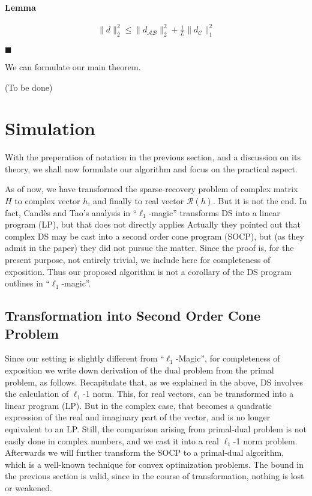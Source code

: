 \documentclass[12pt]{article}
\newcommand{\MC}[1]{\mathcal{#1}}
\newcounter{NumResult}
\newcommand{\myCount}
{
   \stepcounter{NumResult}
   \textbf{\arabic{NumResult}}
}
\newcommand {\Result} [2]
{
   \bigskip
   \myCount \textbf{#1} \par
   {#2} \par
   \hfill \(\blacksquare\)
   \bigskip
}
\begin{document}
\Result
{Lemma}
{
\begin{align}
\|d\|_2^2
\leq \|d_{\MC{A}\MC{B}}\|_2^2 +\frac{1}{L} \|d_{\MC{C}}\|_1^2
\end{align}
}

We can formulate our main theorem.

(To be done)

\section{Simulation}

With the preperation of notation in the previous section, and a discussion on its theory, we shall now formulate our algorithm and focus on the practical aspect.

As of now, we have transformed the sparse-recovery problem of complex matrix \(H\) to complex vector \(h\), and finally to real vector \(\MC{R}(h)\).
But it is not the end.
In fact, Cand\`es and Tao's analysis in ``\(\ell_1\)-magic'' transforms DS into a linear program (LP), but that does not directly applies
Actually they pointed out that complex DS may be cast into a second order cone program (SOCP), but (as they admit in the paper) they did not pursue the matter.
Since the proof is, for the present purpose, not entirely trivial, we include here for completeness of exposition.
Thus our proposed algorithm is not a corollary of the DS program outlines in ``\(\ell_1\)-magic''.

\subsection{Transformation into Second Order Cone Problem}

Since our setting is slightly different from ``\(\ell_1\)-Magic'', for completeness of exposition we write down derivation of the dual problem from the primal problem, as follows.
Recapitulate that, as we explained in the above, DS involves the calculation of \(\ell_1\)-1 norm.
This, for real vectors, can be transformed into a linear program (LP).
But in the complex case, that becomes a quadratic expression of the real and imaginary part of the vector, and is no longer equivalent to an LP.
Still, the comparison arising from primal-dual problem is not easily done in complex numbers, and we cast it into a real \(\ell_1\)-1 norm problem.
Afterwards we will further transform the SOCP to a primal-dual algorithm, which is a well-known technique for convex optimization problems.
The bound in the previous section is valid, since in the course of transformation, nothing is lost or weakened.
\end{document}
